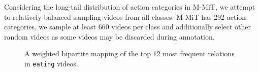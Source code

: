 \documentclass[letterpaper]{article}
\begin{document}
Considering the long-tail distribution of action categories in M-MiT, we attempt to relatively balanced sampling videos from all classes. M-MiT has 292 action categories, we sample at least 660 videos per class and additionally select other random videos as some videos may be discarded during annotation. 
\begin{figure}[t]
  \centering
  \caption{A weighted bipartite mapping of the top 12 most frequent relations in \texttt{eating} videos.}
   \label{fig:sanki}
\end{figure}
\end{document}
